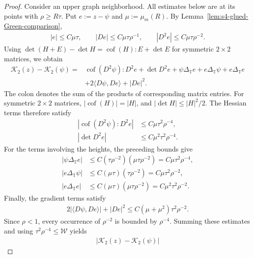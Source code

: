 \documentclass[a4paper,11pt,oneside,reqno]{amsart}
\numberwithin{equation}{section}
\theoremstyle{definition}
\begin{document}
\begin{proof}
    Consider an upper graph neighborhood. All estimates
    below are at its points with $\rho\geq R\tau$.
    Put $e:=z-\psi$ and $\mu:=\mu_m(R)$. By
    Lemma~\ref{lem:s4-glued-Green-comparison},
    \begin{align*}
        |e|\leq C\mu\tau,\qquad
        |De|\leq C\mu\tau\rho^{-1},\qquad
        |D^2e|\leq C\mu\tau\rho^{-2}.
    \end{align*}
    Using
    $\det(H+E)-\det H=\operatorname{cof}(H):E+\det E$
    for symmetric $2\times2$ matrices, we obtain
    \begin{align*}
        \mathcal K_2(z)-\mathcal K_2(\psi)
        ={}&\operatorname{cof}(D^2\psi):D^2e+\det D^2e
             +\psi\Delta_{\mathbb T}e
             +e\Delta_{\mathbb T}\psi
             +e\Delta_{\mathbb T}e\\
        &+2\langle D\psi,De\rangle+|De|^2.
    \end{align*}
    The colon denotes the sum of the products of corresponding
    matrix entries. For symmetric $2\times2$ matrices,
    $|\operatorname{cof}(H)|=|H|$, and
    $|\det H|\leq|H|^2/2$. The Hessian terms therefore
    satisfy
    \begin{align*}
        |\operatorname{cof}(D^2\psi):D^2e|
        &\leq C\mu\tau^2\rho^{-4},\\
        |\det D^2e|&\leq C\mu^2\tau^2\rho^{-4}.
    \end{align*}
    For the terms involving the heights, the preceding
    bounds give
    \begin{align*}
        |\psi\Delta_{\mathbb T}e|
        &\leq C(\tau\rho^{-2})(\mu\tau\rho^{-2})
        =C\mu\tau^2\rho^{-4},\\
        |e\Delta_{\mathbb T}\psi|
        &\leq C(\mu\tau)(\tau\rho^{-2})
        =C\mu\tau^2\rho^{-2},\\
        |e\Delta_{\mathbb T}e|
        &\leq C(\mu\tau)(\mu\tau\rho^{-2})
        =C\mu^2\tau^2\rho^{-2}.
    \end{align*}
    Finally, the gradient terms satisfy
    \begin{align*}
        2|\langle D\psi,De\rangle|+|De|^2
        \leq C(\mu+\mu^2)\tau^2\rho^{-2}.
    \end{align*}
    Since $\rho<1$, every occurrence of $\rho^{-2}$
    is bounded by $\rho^{-4}$. Summing these estimates
    and using $\tau^2\rho^{-4}\leq\mathcal W$ yields
    \begin{align*}
        |\mathcal K_2(z)-\mathcal K_2(\psi)|

\end{align*}
\end{proof}
\end{document}
